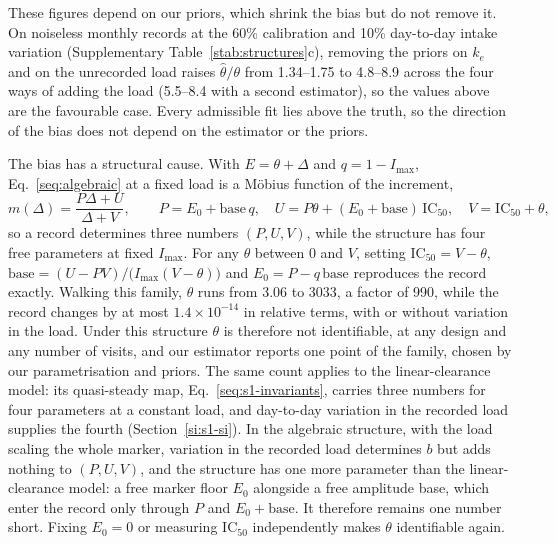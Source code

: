 These figures depend on our priors, which shrink the bias but do not remove it. On noiseless
monthly records at the 60\% calibration and 10\% day-to-day intake variation (Supplementary
Table~\ref{stab:structures}c), removing the priors on $k_e$ and on the unrecorded load raises
$\hat\theta/\theta$ from 1.34--1.75 to 4.8--8.9 across the four ways of adding the load
(5.5--8.4 with a second estimator), so the values above are the favourable case. Every
admissible fit lies above the truth, so the direction of the bias does not depend on the
estimator or the priors.

The bias has a structural cause. With $E=\theta+\Delta$ and $q=1-I_{\max}$,
Eq.~\eqref{seq:algebraic} at a fixed load is a M\"obius function of the increment,
\begin{equation}
\label{seq:moebius}
m(\Delta)=\frac{P\Delta+U}{\Delta+V},\qquad
P=E_0+\mathrm{base}\,q,\quad U=P\theta+(E_0+\mathrm{base})\,\mathrm{IC}_{50},\quad
V=\mathrm{IC}_{50}+\theta ,
\end{equation}
so a record determines three numbers $(P,U,V)$, while the structure has four free parameters at
fixed $I_{\max}$. For any $\theta$ between 0 and $V$, setting $\mathrm{IC}_{50}=V-\theta$,
$\mathrm{base}=(U-PV)/\bigl(I_{\max}(V-\theta)\bigr)$ and $E_0=P-q\,\mathrm{base}$ reproduces the
record exactly. Walking this family, $\theta$ runs from 3.06 to 3033\um, a factor of 990, while the
record changes by at most $1.4\times10^{-14}$ in relative terms, with or without variation in the
load. Under this structure $\theta$ is therefore not identifiable, at any design and any number
of visits, and our estimator reports one point of the family, chosen by our parametrisation and
priors. The same count applies to the linear-clearance model: its quasi-steady map,
Eq.~\eqref{seq:s1-invariants}, carries three numbers for four parameters at a constant load, and
day-to-day variation in the recorded load supplies the fourth (Section~\ref{si:s1-si}). In the algebraic structure, with the load scaling the whole marker,
variation in the recorded load determines $b$ but adds nothing to $(P,U,V)$, and the structure
has one more parameter than the linear-clearance model: a free marker floor $E_0$ alongside a
free amplitude base, which enter the record only through $P$ and $E_0+\mathrm{base}$. It
therefore remains one number short. Fixing $E_0=0$ or measuring $\mathrm{IC}_{50}$
independently makes $\theta$ identifiable again.

